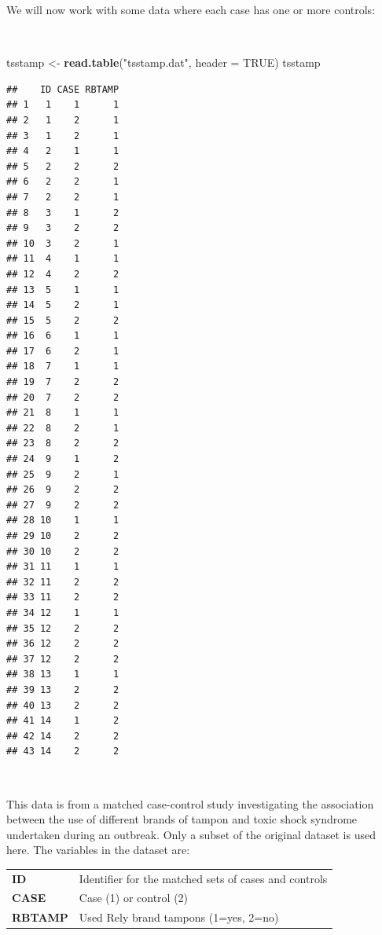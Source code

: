 \documentclass[12pt,a4paper]{book}
\newenvironment{Shaded}{\begin{snugshade}}{\end{snugshade}}
\newcommand{\KeywordTok}[1]{\textcolor[rgb]{0.13,0.29,0.53}{\textbf{#1}}}
\newcommand{\DataTypeTok}[1]{\textcolor[rgb]{0.13,0.29,0.53}{#1}}
\newcommand{\StringTok}[1]{\textcolor[rgb]{0.31,0.60,0.02}{#1}}
\newcommand{\OtherTok}[1]{\textcolor[rgb]{0.56,0.35,0.01}{#1}}
\newcommand{\NormalTok}[1]{#1}
\theoremstyle{definition}
\theoremstyle{definition}
\theoremstyle{definition}
\theoremstyle{remark}
\begin{document}
We will now work with some data where each case has one or more
controls:

~

\begin{Shaded}
\begin{Highlighting}[]
\NormalTok{tsstamp <-}\StringTok{ }\KeywordTok{read.table}\NormalTok{(}\StringTok{"tsstamp.dat"}\NormalTok{, }\DataTypeTok{header =} \OtherTok{TRUE}\NormalTok{)}
\NormalTok{tsstamp}
\end{Highlighting}
\end{Shaded}

\begin{verbatim}
##    ID CASE RBTAMP
## 1   1    1      1
## 2   1    2      1
## 3   1    2      1
## 4   2    1      1
## 5   2    2      2
## 6   2    2      1
## 7   2    2      1
## 8   3    1      2
## 9   3    2      2
## 10  3    2      1
## 11  4    1      1
## 12  4    2      2
## 13  5    1      1
## 14  5    2      1
## 15  5    2      2
## 16  6    1      1
## 17  6    2      1
## 18  7    1      1
## 19  7    2      2
## 20  7    2      2
## 21  8    1      1
## 22  8    2      1
## 23  8    2      2
## 24  9    1      2
## 25  9    2      1
## 26  9    2      2
## 27  9    2      2
## 28 10    1      1
## 29 10    2      2
## 30 10    2      2
## 31 11    1      1
## 32 11    2      2
## 33 11    2      2
## 34 12    1      1
## 35 12    2      2
## 36 12    2      2
## 37 12    2      2
## 38 13    1      1
## 39 13    2      2
## 40 13    2      2
## 41 14    1      2
## 42 14    2      2
## 43 14    2      2
\end{verbatim}

~

This data is from a matched case-control study investigating the
association between the use of different brands of tampon and toxic
shock syndrome undertaken during an outbreak. Only a subset of the
original dataset is used here. The variables in the dataset are:

\newpage

\begin{longtable}[]{@{}ll@{}}
\toprule
\begin{minipage}[t]{0.20\columnwidth}\raggedright
\textbf{ID}\strut
\end{minipage} & \begin{minipage}[t]{0.75\columnwidth}\raggedright
Identifier for the matched sets of cases and controls\strut
\end{minipage}\tabularnewline
\begin{minipage}[t]{0.20\columnwidth}\raggedright
\textbf{CASE}\strut
\end{minipage} & \begin{minipage}[t]{0.75\columnwidth}\raggedright
Case (1) or control (2)\strut
\end{minipage}\tabularnewline
\begin{minipage}[t]{0.20\columnwidth}\raggedright
\textbf{RBTAMP}\strut
\end{minipage} & \begin{minipage}[t]{0.75\columnwidth}\raggedright
Used Rely brand tampons (1=yes, 2=no)\strut
\end{minipage}\tabularnewline
\bottomrule
\end{longtable}
\end{document}
